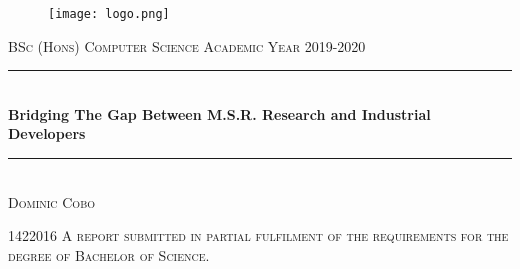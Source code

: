 \documentclass[a4paper, 10pt]{report}
\newcommand{\fypCourse}{BSc (Hons) Computer Science}
\newcommand{\fypStudent}{Dominic Cobo}
\newcommand{\fypStudentId}{1422016}
\newcommand{\fypAcademicYear}{2019-2020}
\newcommand{\fypTitle}{Bridging The Gap Between M.S.R. Research and Industrial Developers}
\begin{document}
	\begin{titlepage}
		\centering
		\begin{figure}
			\texttt{[image: logo.png]}
		\end{figure}
		\textsc{\fypCourse}
		\textsc{Academic Year \fypAcademicYear}
		
		\rule{\linewidth}{0.5mm} \\[0.5cm]
		{ \huge\textbf { \fypTitle } } \\
		\rule{\linewidth}{0.5mm} \\[6cm]
		
		
		\textsc{\fypStudent}
		
		\textsc{\fypStudentId}
		\linebreak[20]
		\textsc{A report submitted in partial fulfilment of the requirements for the degree of Bachelor of Science.}
		
	\end{titlepage}
	\newpage
\end{document}
